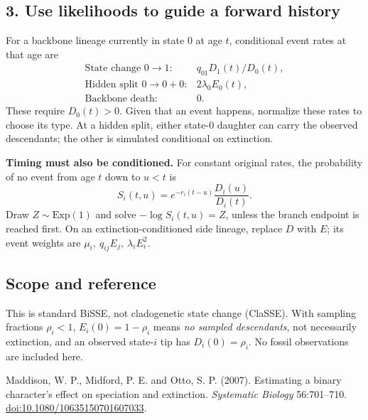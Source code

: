 \documentclass[11pt,a4paper]{article}
\begin{document}
\subsection*{3. Use likelihoods to guide a forward history}
For a backbone lineage currently in state 0 at age \(t\), conditional event
rates at that age are
\[
\begin{array}{ll}
\text{State change }0\to1:&q_{01}D_1(t)/D_0(t),\\[2pt]
\text{Hidden split }0\to0+0:&2\lambda_0E_0(t),\\[2pt]
\text{Backbone death}:&0.
\end{array}
\]
These require \(D_0(t)>0\). Given that an event happens, normalize these rates
to choose its type. At a hidden split, either state-0 daughter can carry the
observed descendants; the other is simulated conditional on extinction.

\textbf{Timing must also be conditioned.} For constant original rates, the
probability of no event from age \(t\) down to \(u<t\) is
\[
S_i(t,u)=e^{-r_i(t-u)}\frac{D_i(u)}{D_i(t)}.
\]
Draw \(Z\sim\mathrm{Exp}(1)\) and solve \(-\log S_i(t,u)=Z\), unless the
branch endpoint is reached first. On an extinction-conditioned side lineage,
replace \(D\) with \(E\); its event weights are
\(\mu_i,\ q_{ij}E_j,\ \lambda_iE_i^2\).

\subsection*{Scope and reference}
This is standard BiSSE, not cladogenetic state change (ClaSSE).
With sampling fractions \(\rho_i<1\), \(E_i(0)=1-\rho_i\) means
\emph{no sampled descendants}, not necessarily extinction, and an observed
state-\(i\) tip has \(D_i(0)=\rho_i\).
No fossil observations are included here.

{\small Maddison, W. P., Midford, P. E. and Otto, S. P. (2007).
Estimating a binary character's effect on speciation and extinction.
\emph{Systematic Biology} 56:701--710.
\href{https://doi.org/10.1080/10635150701607033}{doi:10.1080/10635150701607033}.}
\end{document}
